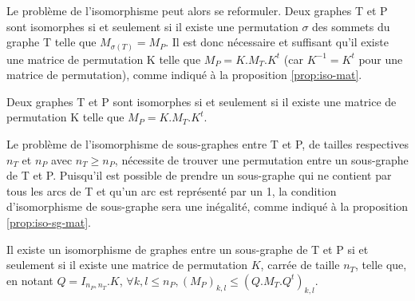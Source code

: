 Le problème de l'isomorphisme peut alors se reformuler. Deux graphes T et P sont isomorphes si et seulement si il existe une permutation $\sigma$ des sommets du graphe T telle
que $M_{\sigma(T)}=M_P$. Il est donc nécessaire et suffisant qu'il existe une matrice de permutation K telle que $M_P = K.M_T.K^t$ (car $K^{-1}=K^t$ pour une matrice de permutation), comme indiqué à la proposition \ref{prop:iso-mat}.

\begin{prop}
 Deux graphes T et P sont isomorphes si et seulement si il existe une matrice de permutation K telle que $M_P = K.M_T.K^t$.
 \label{prop:iso-mat}
\end{prop}

Le problème de l'isomorphisme de sous-graphes entre T et P, de tailles respectives $n_T$ et $n_P$ avec $n_T\geq n_P$, nécessite de trouver une permutation entre un sous-graphe de T et P.
Puisqu'il est possible de prendre un sous-graphe qui ne contient par tous les arcs de T et qu'un arc est représenté par un 1, la condition d'isomorphisme de sous-graphe sera une inégalité, comme indiqué à la proposition \ref{prop:iso-sg-mat}.

\begin{prop}
Il existe un isomorphisme de graphes entre un sous-graphe de T et P si et seulement si il existe une matrice de permutation $K$, carrée de taille $n_T$, telle que, en notant $Q=I_{n_P, n_T}.K$, $\forall k,l\leq n_P, (M_P)_{k,l}\leq (Q.M_T.Q^t)_{k,l}$.
\label{prop:iso-sg-mat}
\end{prop}

